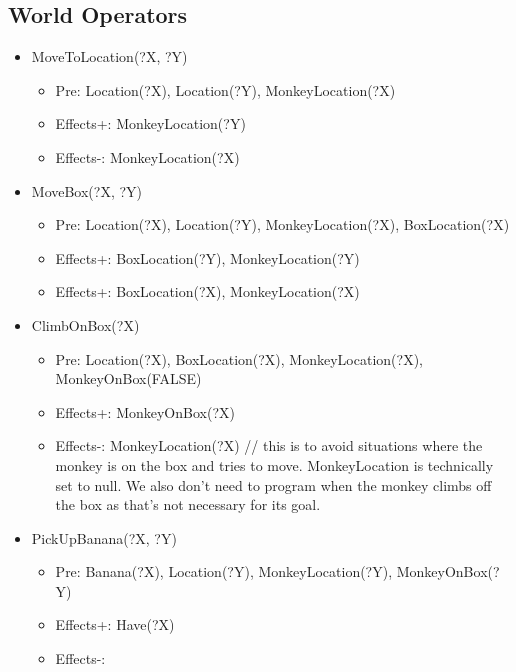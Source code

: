 \documentclass{article}
\begin{document}
\subsection*{World Operators}
\begin{itemize}
    \item MoveToLocation(?X, ?Y)
        \begin{itemize}
            \item Pre: Location(?X), Location(?Y), MonkeyLocation(?X)
            \item Effects+: MonkeyLocation(?Y)
            \item Effects-: MonkeyLocation(?X)
        \end{itemize}
    \item MoveBox(?X, ?Y)
        \begin{itemize}
            \item Pre: Location(?X), Location(?Y), MonkeyLocation(?X),
            BoxLocation(?X)
            \item Effects+: BoxLocation(?Y), MonkeyLocation(?Y)
            \item Effects+: BoxLocation(?X), MonkeyLocation(?X)
        \end{itemize}
    \item ClimbOnBox(?X)
        \begin{itemize}
            \item Pre: Location(?X), BoxLocation(?X), MonkeyLocation(?X),
            MonkeyOnBox(FALSE)
            \item Effects+: MonkeyOnBox(?X)
            \item Effects-: MonkeyLocation(?X) // this is to avoid situations
            where the monkey is on the box and tries to move. MonkeyLocation is
            technically set to null. We also don't need to program when the
            monkey climbs off the box as that's not necessary for its goal.
        \end{itemize}
    \item PickUpBanana(?X, ?Y)
        \begin{itemize}
            \item Pre: Banana(?X), Location(?Y),
                MonkeyLocation(?Y), MonkeyOnBox(?Y)
            \item Effects+: Have(?X)
            \item Effects-: 
        \end{itemize}
\end{itemize}
\end{document}
